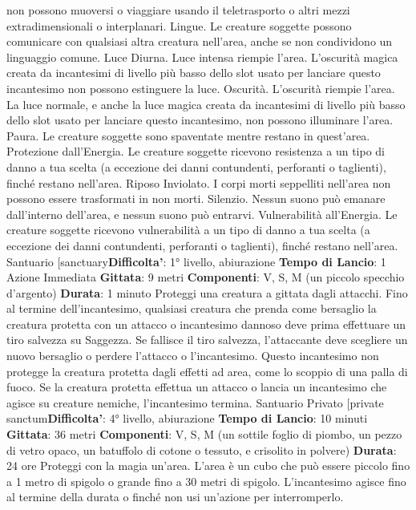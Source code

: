 \begin{multicols}{2}
non possono muoversi o viaggiare usando il
teletrasporto o altri mezzi extradimensionali o
interplanari.
Lingue. Le creature soggette possono comunicare con
qualsiasi altra creatura nell’area, anche se non
condividono un linguaggio comune.
Luce Diurna. Luce intensa riempie l’area. L’oscurità
magica creata da incantesimi di livello più basso dello
slot usato per lanciare questo incantesimo non possono
estinguere la luce.
Oscurità. L’oscurità riempie l’area. La luce normale, e
anche la luce magica creata da incantesimi di livello più
basso dello slot usato per lanciare questo incantesimo,
non possono illuminare l’area.
Paura. Le creature soggette sono spaventate mentre
restano in quest’area.
Protezione dall’Energia. Le creature soggette
ricevono resistenza a un tipo di danno a tua scelta (a
eccezione dei danni contundenti, perforanti o taglienti),
finché restano nell’area.
Riposo Inviolato. I corpi morti seppelliti nell’area non
possono essere trasformati in non morti.
Silenzio. Nessun suono può emanare dall’interno
dell’area, e nessun suono può entrarvi.
Vulnerabilità all’Energia. Le creature soggette
ricevono vulnerabilità a un tipo di danno a tua scelta (a
eccezione dei danni contundenti, perforanti o taglienti),
finché restano nell’area.
Santuario
[sanctuary\textbf{Difficolta'}:
1° livello, abiurazione
\textbf{Tempo di Lancio}: 1 Azione Immediata
\textbf{Gittata}: 9 metri
\textbf{Componenti}: V, S, M (un piccolo specchio d’argento)
\textbf{Durata}: 1 minuto
Proteggi una creatura a gittata dagli attacchi. Fino al
termine dell’incantesimo, qualsiasi creatura che prenda
come bersaglio la creatura protetta con un attacco o
incantesimo dannoso deve prima effettuare un tiro
salvezza su Saggezza. Se fallisce il tiro salvezza,
l’attaccante deve scegliere un nuovo bersaglio o
perdere l’attacco o l’incantesimo. Questo incantesimo
non protegge la creatura protetta dagli effetti ad area,
come lo scoppio di una palla di fuoco.
Se la creatura protetta effettua un attacco o lancia un
incantesimo che agisce su creature nemiche,
l’incantesimo termina.
Santuario Privato
[private sanctum\textbf{Difficolta'}:
4° livello, abiurazione
\textbf{Tempo di Lancio}: 10 minuti
\textbf{Gittata}: 36 metri
\textbf{Componenti}: V, S, M (un sottile foglio di piombo, un
pezzo di vetro opaco, un batuffolo di cotone o tessuto, e
crisolito in polvere)
\textbf{Durata}: 24 ore
Proteggi con la magia un’area. L’area è un cubo che
può essere piccolo fino a 1 metro di spigolo o grande
fino a 30 metri di spigolo. L’incantesimo agisce fino al
termine della durata o finché non usi un’azione per
interromperlo.

\end{multicols}
